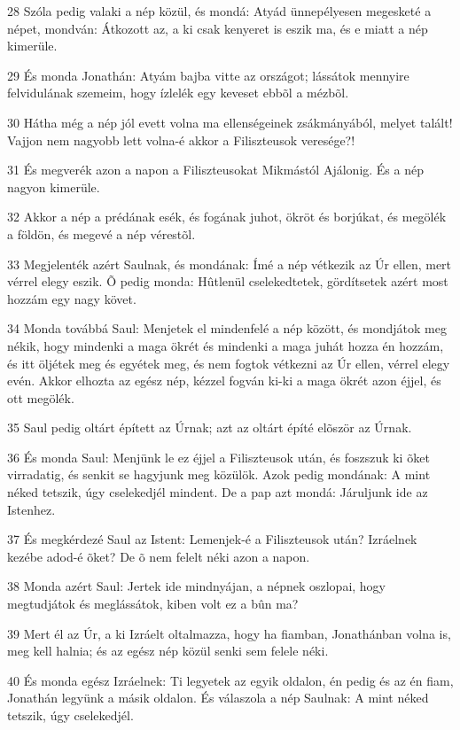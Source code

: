 \par 28 Szóla pedig valaki a nép közül, és mondá: Atyád ünnepélyesen megesketé a népet, mondván: Átkozott az, a ki csak kenyeret is eszik ma, és e miatt a nép kimerüle.
\par 29 És monda Jonathán: Atyám bajba vitte az országot; lássátok mennyire felvidulának szemeim, hogy ízlelék egy keveset ebbõl a mézbõl.
\par 30 Hátha még a nép jól evett volna ma ellenségeinek zsákmányából, melyet talált! Vajjon nem nagyobb lett volna-é akkor a Filiszteusok veresége?!
\par 31 És megverék azon a napon a Filiszteusokat Mikmástól Ajálonig. És a nép nagyon kimerüle.
\par 32 Akkor a nép a prédának esék, és fogának juhot, ökröt és borjúkat, és megölék a földön, és megevé a nép vérestõl.
\par 33 Megjelenték azért Saulnak, és mondának: Ímé a nép vétkezik az Úr ellen, mert vérrel elegy eszik. Õ pedig monda: Hûtlenül cselekedtetek, gördítsetek azért most hozzám egy nagy követ.
\par 34 Monda továbbá Saul: Menjetek el mindenfelé a nép között, és mondjátok meg nékik, hogy mindenki a maga ökrét és mindenki a maga juhát hozza én hozzám, és itt öljétek meg és egyétek meg, és nem fogtok vétkezni az Úr ellen, vérrel elegy evén. Akkor elhozta az egész nép, kézzel fogván ki-ki a maga ökrét azon éjjel, és ott megölék.
\par 35 Saul pedig oltárt épített az Úrnak; azt az oltárt építé elõször az Úrnak.
\par 36 És monda Saul: Menjünk le ez éjjel a Filiszteusok után, és foszszuk ki õket virradatig, és senkit se hagyjunk meg közülök. Azok pedig mondának: A mint néked tetszik, úgy cselekedjél mindent. De a pap azt mondá: Járuljunk ide az Istenhez.
\par 37 És megkérdezé Saul az Istent: Lemenjek-é a Filiszteusok után? Izráelnek kezébe adod-é õket? De õ nem felelt néki azon a napon.
\par 38 Monda azért Saul: Jertek ide mindnyájan, a népnek oszlopai, hogy megtudjátok és meglássátok, kiben volt ez a bûn ma?
\par 39 Mert él az Úr, a ki Izráelt oltalmazza, hogy ha fiamban, Jonathánban volna is, meg kell halnia; és az egész nép közül senki sem felele néki.
\par 40 És monda egész Izráelnek: Ti legyetek az egyik oldalon, én pedig és az én fiam, Jonathán legyünk a másik oldalon. És válaszola a nép Saulnak: A mint néked tetszik, úgy cselekedjél.
